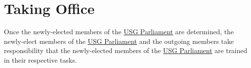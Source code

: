 \section{Taking Office}
Once the newly-elected members of the \hyperref[USGParliamentDef]{USG Parliament} are determined, the newly-elect members of the \hyperref[USGParliamentDef]{USG Parliament} and the outgoing members take responsibility that the newly-elected members of the \hyperref[USGParliamentDef]{USG Parliament} are trained in their respective tasks.